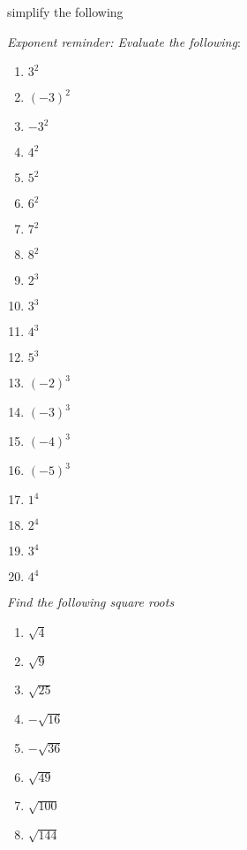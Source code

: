 \begin{myexample}
\drillandskill
\Gls{simplify} the following
\end{myexample}
{\em Exponent reminder: Evaluate the following}:
\begin{multicols}{4}
	\begin{enumerate}
		\item $3^2$  
		\item $(-3)^2$ 
		\item $-3^2$ 
		\item $4^2$ 
		\item $5^2$ 
		\item $6^2$ 
		\item $7^2$ 
		\item $8^2$ 
		\item $2^3$ 
		\item $3^3$ 
		\item $4^3$ 
		\item $5^3$ 
		\item $(-2)^3$ 
		\item $(-3)^3$ 
		\item $(-4)^3$ 
		\item $(-5)^3$ 
		\item $1^4$ 
		\item $2^4$ 
		\item $3^4$ 
		\item $4^4$ 
	\end{enumerate}
\end{multicols}
{\em Find the following square roots}
\begin{multicols}{4}
	\begin{enumerate}
		\item $\sqrt{4}$ 
		\item $\sqrt{9}$ 
		\item $\sqrt{25}$ 
		\item $-\sqrt{16}$ 
		\item $-\sqrt{36}$ 
		\item $\sqrt{49}$ 
		\item $\sqrt{100}$ 
		\item $\sqrt{144}$ 
	\end{enumerate}
\end{multicols}

